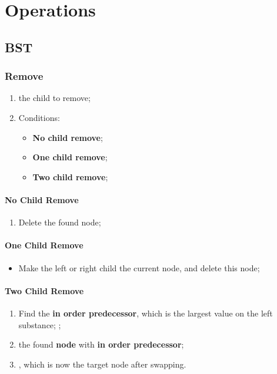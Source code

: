 \section{Operations}

\subsection{BST}

  \subsubsection{Remove}
  
    \begin{enumerate}
      \item {} the child to remove;
      \item Conditions:
      \begin{itemize}
        \item \textbf{No child remove};
        \item \textbf{One child remove};
        \item \textbf{Two child remove};
      \end{itemize}
    \end{enumerate}
    
    \paragraph{No Child Remove}
    \begin{enumerate}
      \item Delete the found node;
    \end{enumerate}
    
    \paragraph{One Child Remove}
    \begin{itemize}
      \item Make the left or right child the 
      current node, and delete this node;
    \end{itemize}
    
    \paragraph{Two Child Remove}
    \begin{enumerate}
      \item Find the \textbf{in order predecessor}, which is the largest
      value on the left substance; ;
      \item {} the found \textbf{node} 
      with \textbf{in order predecessor};
      \item {}, which is now the 
      target node after swapping.
    \end{enumerate}
    
